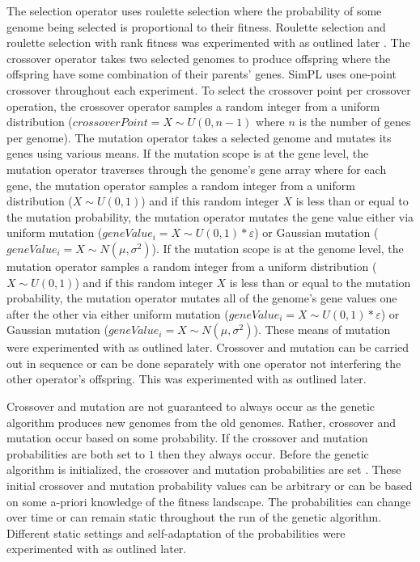 \documentclass[a4paper,10pt]{article}
\begin{document}
\vspace{3mm}

The selection operator uses roulette selection where the probability of some genome being selected is proportional to their fitness. Roulette selection and roulette selection with rank fitness was experimented with as outlined later \cite{geneticalgorithm}. The crossover operator takes two selected genomes to produce offspring where the offspring have some combination of their parents' genes. SimPL uses one-point crossover throughout each experiment. To select the crossover point per crossover operation, the crossover operator samples a random integer from a uniform distribution ($crossoverPoint = X\!\sim\!U(0,n-1)$ where $n$ is the number of genes per genome). The mutation operator takes a selected genome and mutates its genes using various means. If the mutation scope is at the gene level, the mutation operator traverses through the genome's gene array where for each gene, the mutation operator samples a random integer from a uniform distribution ($X\!\sim\!U(0,1)$) and if this random integer $X$ is less than or equal to the mutation probability, the mutation operator mutates the gene value either via uniform mutation ($geneValue_i = X\!\sim\!U(0,1) * \varepsilon$) or Gaussian mutation ($geneValue_i = X\!\sim\!N(\mu,\sigma^2)$). If the mutation scope is at the genome level, the mutation operator samples a random integer from a uniform distribution ($X\sim U(0,1)$) and if this random integer $X$ is less than or equal to the mutation probability, the mutation operator mutates all of the genome's gene values one after the other via either uniform mutation ($geneValue_i = X\!\sim\!U(0,1) * \varepsilon$) or Gaussian mutation ($geneValue_i = X\!\sim\!N(\mu,\sigma^2)$). These means of mutation were experimented with as outlined later. Crossover and mutation can be carried out in sequence or can be done separately with one operator not interfering the other operator's offspring. This was experimented with as outlined later.

Crossover and mutation are not guaranteed to always occur as the genetic algorithm produces new genomes from the old genomes. Rather, crossover and mutation occur based on some probability. If the crossover and mutation probabilities are both set to $1$ then they always occur. Before the genetic algorithm is initialized, the crossover and mutation probabilities are set \cite{self_adapt}. These initial crossover and mutation probability values can be arbitrary or can be based on some a-priori knowledge of the fitness landscape. The probabilities can change over time or can remain static throughout the run of the genetic algorithm. Different static settings and self-adaptation of the probabilities were experimented with as outlined later. 
\end{document}
